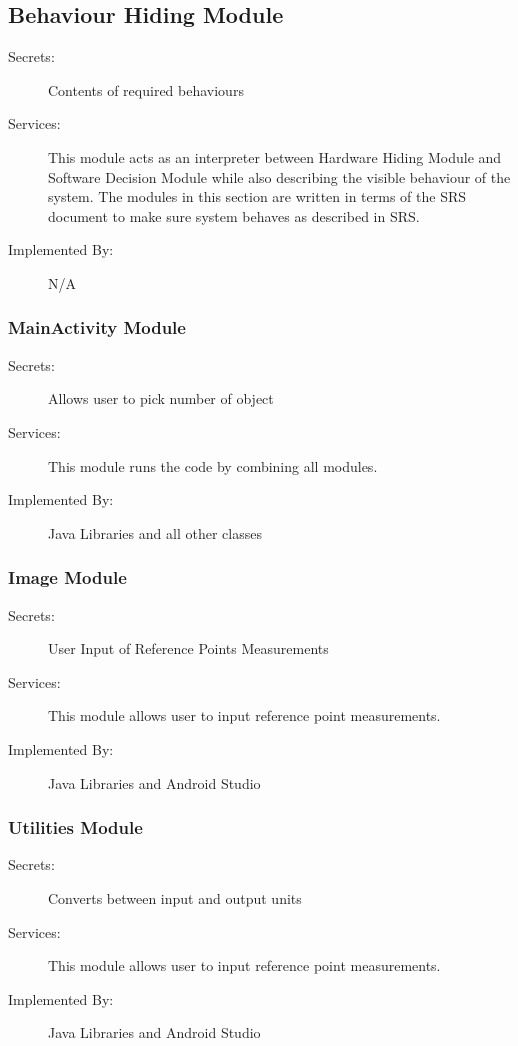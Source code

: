 \documentclass[12pt, titlepage]{article}
\begin{document}
\subsection{Behaviour Hiding Module}
\begin{description}
\item[Secrets:] Contents of required behaviours
\item[Services:] This module acts as an interpreter between Hardware Hiding Module and Software Decision Module while also describing the visible behaviour of the system. The modules in this section are written in terms of the SRS document to make sure system behaves as described in SRS.  
\item[Implemented By:] N/A
\end{description}

{\color{red}
\subsubsection{MainActivity Module}
\begin{description}
\item[Secrets:] Allows user to pick number of object
\item[Services:] This module runs the code by combining all modules.
\item[Implemented By:] Java Libraries and {\color{red} all other classes}
\end{description}

\subsubsection{Image Module}
\begin{description}
\item[Secrets:] User Input of Reference Points Measurements
\item[Services:] This module allows user to input reference point measurements.
\item[Implemented By:] Java Libraries and Android Studio
\end{description}

\subsubsection{Utilities Module}
\begin{description}
\item[Secrets:] Converts between input and output units
\item[Services:] This module allows user to input reference point measurements.
\item[Implemented By:] Java Libraries and Android Studio
\end{description}
}
\end{document}
